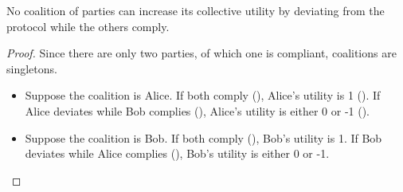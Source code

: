 \begin{lemma}
  No coalition of parties can increase its collective utility
  by deviating from the protocol while the others comply.
\end{lemma}
\begin{proof}
Since there are only two parties, of which one is compliant,
coalitions are singletons.
  \begin{itemize}
  \item
    Suppose the coalition is Alice.
    If both comply (),
    Alice's utility is 1 ().
    If Alice deviates while Bob complies (),
    Alice's utility is either 0 or -1 ().

  \item
    Suppose the coalition is Bob.
    If both comply (), Bob's utility is 1.
    If Bob deviates while Alice complies (),
    Bob's utility is either 0 or -1.
  \end{itemize}
\end{proof}

